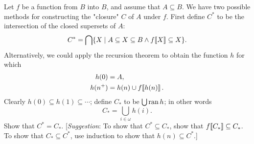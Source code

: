 \documentclass{report}
\begin{document}
Let $f$ be a function from $B$ into $B$, and assume that $A \subseteq B$.
We have two possible methods for constructing the "closure" $C$ of $A$ under
  $f$.
First define $C^*$ to be the intersection of the closed supersets of $A$:
  \begin{equation}
    \label{sub:exercise-4.9-eq1}
    C^* = \bigcap\{X \mid
      A \subseteq X \subseteq B \land f\!\left\llbracket X\right\rrbracket \subseteq X\}.
  \end{equation}
Alternatively, we could apply the recursion theorem to obtain the function $h$
  for which
  \begin{align*}
    h(0) & = A, \\
    h(n^+) & = h(n) \cup f\!\left\llbracket h(n)\right\rrbracket.
  \end{align*}
Clearly $h(0) \subseteq h(1) \subseteq \cdots$; define $C_*$ to be
  $\bigcup\mathop{\text{ran}}{h}$; in other words
  \begin{equation}
    \label{sub:exercise-4.9-eq2}
    C_* = \bigcup_{i \in \omega} h(i).
  \end{equation}
Show that $C^* = C_*$.
[\textit{Suggestion}:
To show that $C^* \subseteq C_*$, show that $f\!\left\llbracket C_*\right\rrbracket \subseteq C_*$.
To show that $C_* \subseteq C^*$, use induction to show that
  $h(n) \subseteq C^*$.]
\end{document}
